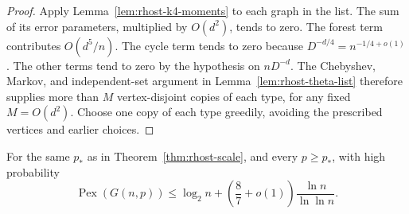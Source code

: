 \begin{proof}
Apply Lemma~\ref{lem:rhost-k4-moments} to each graph in the list.
The sum of its error parameters, multiplied by $O(d^2)$, tends to zero.
The forest term contributes $O(d^5/n)$.
The cycle term tends to zero because $D^{-d/4}=n^{-1/4+o(1)}$.
The other terms tend to zero by the hypothesis on $nD^{-d}$.
The Chebyshev, Markov, and independent-set argument in Lemma~\ref{lem:rhost-theta-list}
therefore supplies more than $M$ vertex-disjoint copies of each type, for any fixed $M=O(d^2)$.
Choose one copy of each type greedily, avoiding the prescribed vertices and earlier choices.
\end{proof}

\begin{theorem}
\label{thm:rhost-eight-sevenths}
For the same $p_*$ as in Theorem~\ref{thm:rhost-scale}, and every $p\ge p_*$,
with high probability
\[
 \operatorname{Pex}(G(n,p))
 \le\log_2n+\left(\frac87+o(1)\right)\frac{\ln n}{\ln\ln n}.
\]
\end{theorem}

